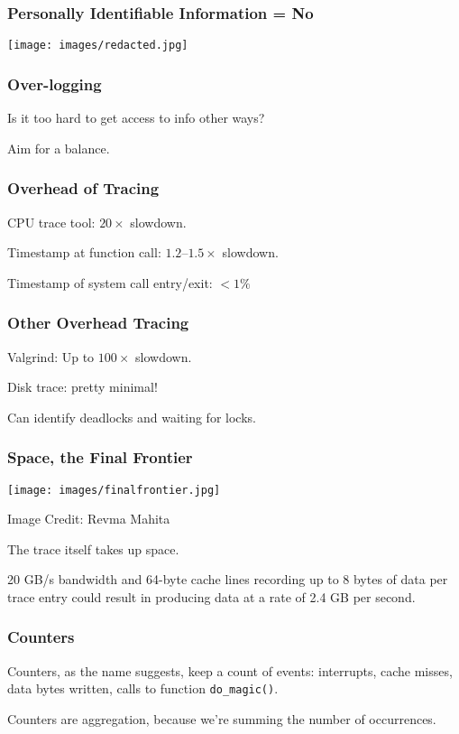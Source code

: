 \begin{frame}
\frametitle{Personally Identifiable Information = No}

\begin{center}
	\texttt{[image: images/redacted.jpg]}
\end{center}

\end{frame}


\begin{frame}
\frametitle{Over-logging}

Is it too hard to get access to info other ways?

Aim for a balance.


\end{frame}


\begin{frame}
\frametitle{Overhead of Tracing}

CPU trace tool: $20\times$ slowdown.

Timestamp at function call: $1.2$--$1.5\times$ slowdown.

Timestamp of system call entry/exit: $< 1\%$

\end{frame}


\begin{frame}
\frametitle{Other Overhead Tracing}

Valgrind: Up to $100\times$ slowdown.

Disk trace: pretty minimal!

Can identify deadlocks and waiting for locks.

\end{frame}


\begin{frame}
\frametitle{Space, the Final Frontier}

\begin{center}
	\texttt{[image: images/finalfrontier.jpg]}
\end{center}
\hfill Image Credit: Revma Mahita

The trace itself takes up space.

20 GB/s bandwidth and 64-byte cache lines recording up to 8 bytes of data per trace entry could result in producing data at a rate of 2.4 GB per second.

\end{frame}


\begin{frame}
\frametitle{Counters}

Counters, as the name suggests, keep a count of events: interrupts, cache misses, data bytes written, calls to function \texttt{do\_magic()}.


Counters are aggregation, because we're summing the number of occurrences.

\end{frame}


